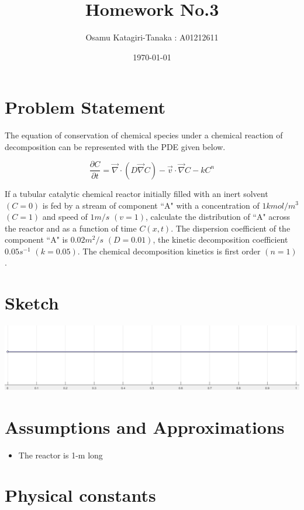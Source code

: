 \documentclass{article}
\title{Homework No.3}
\author{Osamu Katagiri-Tanaka : A01212611}
\date{\today}
\begin{document}
\maketitle

\section{Problem Statement}

The equation of conservation of chemical species under a chemical reaction of
decomposition can be represented with the PDE given below.

$$ \frac{\partial C}{\partial t} = \vec{\nabla} \cdot (D \vec{\nabla} C) - \vec{v} \cdot \vec{\nabla} C - k C^n $$

If a tubular catalytic chemical reactor initially filled with an inert solvent $(C = 0)$ is fed by a stream of component ``A" with a concentration of $1 kmol/m^3$ $(C = 1)$ and speed of $1 m/s$ $(v = 1)$, calculate the distribution of ``A" across the reactor and as a function of time $C(x, t)$. The dispersion coefficient of the component ``A" is $0.02 m^2/s$ $(D = 0.01)$, the kinetic decomposition coefficient $0.05 s^{-1}$ $(k = 0.05)$. The chemical decomposition kinetics is first order $(n = 1)$.

\section{Sketch}

\begin{center}
\includegraphics[width=\textwidth]{./img/Sketch.png}
\end{center}

\section{Assumptions and Approximations}

\begin{itemize}
\item The reactor is 1-m long
\end{itemize}

\section{Physical constants}
\end{document}
